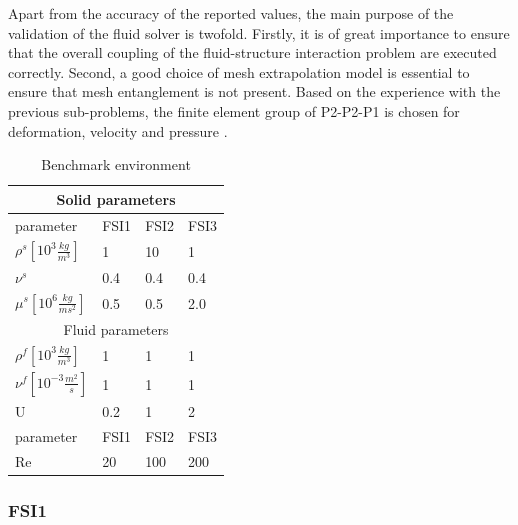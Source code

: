 Apart from the accuracy of the reported values, the main purpose of the validation of the fluid solver is twofold. Firstly, it is of great importance to ensure that the overall coupling of the fluid-structure interaction problem are executed correctly. Second, a good choice of mesh extrapolation model is essential to ensure that mesh entanglement is not present. Based on the experience with the previous sub-problems, the finite element group of P2-P2-P1 is chosen for deformation, velocity and pressure  . 


\begin{table}[h!]
\centering
\caption{Benchmark environment}
\label{my-label}
\begin{tabular}{ |p{3cm}||p{2cm}|p{2cm}|p{2cm}|  }
 \hline
 \multicolumn{4}{|c|}{Solid parameters} \\
 \hline
 parameter              & FSI1 & FSI2 & FSI3 \\
 \hline
 $\rho^s [10^{3} \frac{kg}{m^3}]$ & 1    & 10   & 1    \\
$\nu^s$ & 0.4  & 0.4  & 0.4  \\
$\mu^s  [10^{6}\frac{kg}{ms^2}]$  & 0.5  & 0.5  & 2.0  \\
 \hline
 \multicolumn{4}{|c|}{Fluid parameters} \\
 \hline
$\rho^f [10^{3}\frac{kg}{m^3}]$ & 1    & 1    & 1    \\
$\nu^f  [10^{-3}\frac{m^2}{s}]$  & 1    & 1    & 1    \\
U                      & 0.2  & 1    & 2    \\
parameter              & FSI1 & FSI2 & FSI3 \\
Re                     & 20   & 100  & 200 \\
\hline
\end{tabular}
\end{table}

\newpage
\subsubsection{FSI1}


